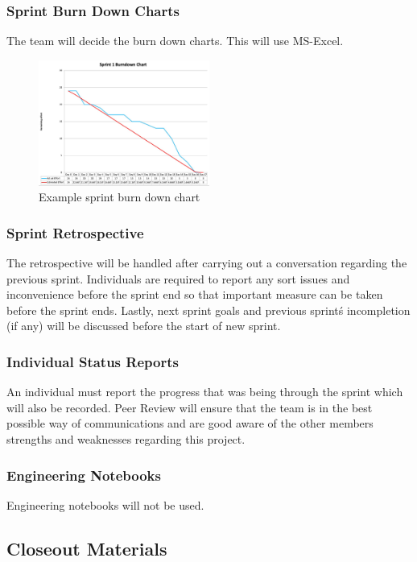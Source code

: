 \subsubsection{Sprint Burn Down Charts}
The team will decide the burn down charts. This will use MS-Excel. 

\begin{figure}[h!]
    \centering
    \includegraphics[width=0.5\textwidth]{images/burndown_example2.png}
    \caption{Example sprint burn down chart}
\end{figure}

\subsubsection{Sprint Retrospective}
The retrospective will be handled after carrying out a conversation regarding the previous sprint. Individuals are required to report any sort issues and inconvenience before the sprint end so that important measure can be taken before the sprint ends. Lastly, next sprint goals and previous sprint\'s incompletion (if any) will be discussed before the start of new sprint.  

\subsubsection{Individual Status Reports}
An individual must report the progress that was being through the sprint which will also be recorded. Peer Review will ensure that the team is in the best possible way of communications and are good aware of the other members strengths and weaknesses regarding this project. 

\subsubsection{Engineering Notebooks}
Engineering notebooks will not be used. 

\subsection{Closeout Materials}

